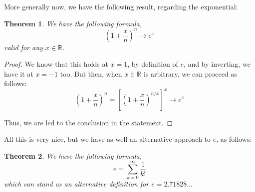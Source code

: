 \documentclass[12pt]{amsbook}
\newtheorem{theorem}{Theorem}[chapter]
\begin{document}
More generally now, we have the following result, regarding the exponential:


\begin{theorem}
We have the following formula,
$$\left(1+\frac{x}{n}\right)^n\to e^x$$
valid for any $x\in\mathbb R$.
\end{theorem}

\begin{proof}
We know that this holds at $x=1$, by definition of $e$, and by inverting, we have it at $x=-1$ too. But then, when $x\in\mathbb R$ is arbitrary, we can proceed as follows:
$$\left(1+\frac{x}{n}\right)^n=\left[\left(1+\frac{x}{n}\right)^{n/x}\right]^x
\to e^x$$

Thus, we are led to the conclusion in the statement.
\end{proof}

All this is very nice, but we have as well an alternative approach to $e$, as follows:

\begin{theorem}
We have the following formula,
$$e=\sum_{k=0}^\infty\frac{1}{k!}$$
which can stand as an alternative definition for $e=2.71828\ldots$
\end{theorem}
\end{document}
